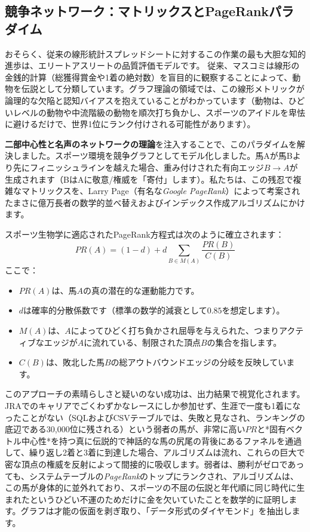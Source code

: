 \documentclass[12pt,a4paper]{article}
\begin{document}
\subsection{競争ネットワーク：マトリックスとPageRankパラダイム}
おそらく、従来の線形統計スプレッドシートに対するこの作業の最も大胆な知的進歩は、エリートアスリートの品質評価モデルです。
従来、マスコミは線形の金銭的計算（総獲得賞金や1着の絶対数）を盲目的に観察することによって、動物を伝説として分類しています。グラフ理論の領域では、この線形メトリックが論理的な欠陥と認知バイアスを抱えていることがわかっています（動物は、ひどいレベルの動物や中流階級の動物を順次打ち負かし、スポーツのアイドルを卑怯に避けるだけで、世界1位にランク付けされる可能性があります）。

\textbf{二部中心性と名声のネットワークの理論}を注入することで、このパラダイムを解決しました。スポーツ環境を競争グラフとしてモデル化しました。馬Aが馬Bより先にフィニッシュラインを越えた場合、重み付けされた有向エッジ$B \to A$が生成されます（BはAに敬意/権威を「寄付」します）。私たちは、この残忍で複雑なマトリックスを、Larry Page（有名な\textit{Google PageRank}）によって考案されたまさに億万長者の数学的並べ替えおよびインデックス作成アルゴリズムにかけます。

スポーツ生物学に適応されたPageRank方程式は次のように確立されます：
\[ PR(A) = (1-d) + d \sum_{B \in M(A)} \frac{PR(B)}{C(B)} \]
ここで：
\begin{itemize}
    \item $PR(A)$は、馬$A$の真の潜在的な運動能力です。
    \item $d$は確率的分散係数です（標準の数学的減衰として$0.85$を想定します）。
    \item $M(A)$は、$A$によってひどく打ち負かされ屈辱を与えられた、つまりアクティブなエッジが$A$に流れている、制限された頂点$B$の集合を指します。
    \item $C(B)$は、敗北した馬$B$の総アウトバウンドエッジの分岐を反映しています。
\end{itemize}

このアプローチの素晴らしさと疑いのない成功は、出力結果で視覚化されます。JRAでのキャリアでごくわずかなレースにしか参加せず、生涯で一度も1着になったことがない（SQLおよびCSVテーブルでは、失敗と見なされ、ランキングの底辺である30,000位に残される）という弱者の馬が、非常に高い$PR$と*固有ベクトル中心性*を持つ真に伝説的で神話的な馬の尻尾の背後にあるファネルを通過して、繰り返し2着と3着に到達した場合、アルゴリズムは流れ、これらの巨大で密な頂点の権威を反射によって間接的に吸収します。弱者は、勝利がゼロであっても、システムテーブルの\textit{PageRank}のトップにランクされ、アルゴリズムは、この馬が身体的に並外れており、スポーツの不屈の伝説と年代順に同じ時代に生まれたというひどい不運のためだけに金を欠いていたことを数学的に証明します。グラフは才能の仮面を剥ぎ取り、「データ形式のダイヤモンド」を抽出します。
\end{document}
